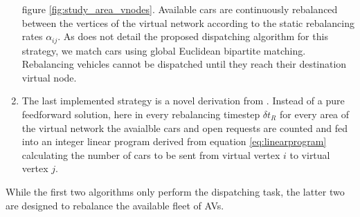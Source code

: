 \begin{enumerate}
figure \ref{fig:study_area_vnodes}. Available cars are continuously rebalanced between
the vertices of the virtual network according to the static rebalancing rates $\alpha_{ij}$.
As \cite{pavone2011load} does not detail the proposed dispatching algorithm for this strategy, we match
cars using global Euclidean bipartite matching. Rebalancing vehicles cannot be dispatched
until they reach their destination virtual node.
\item The last implemented strategy is a novel derivation from \cite{pavone2011load}. Instead of a pure
feedforward solution, here in every rebalancing timestep $\delta t_R$
for every area of the virtual network the avaialble cars and open requests are counted
and fed into an integer linear program derived from equation \ref{eq:linearprogram}
calculating the number of cars to be sent from virtual vertex $i$ to virtual vertex $j$.
\end{enumerate}

While the first two algorithms only perform the dispatching task, the latter two
are designed to rebalance the available fleet of AVs.
